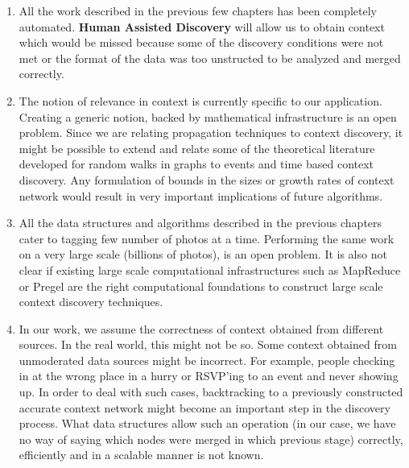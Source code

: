 \begin{enumerate}
\item All the work described in the previous few chapters has been completely automated. \textbf{Human Assisted Discovery} will allow us to obtain context which would be missed because some of the discovery conditions were not met or the format of the data was too unstructed to be analyzed and merged correctly. 

\item The notion of relevance in context is currently specific to our application. Creating a generic notion, backed by mathematical infrastructure is an open problem. Since we are relating propagation techniques to context discovery, it might be possible to extend and relate some of the theoretical literature developed for random walks in graphs to events and time based context discovery. Any formulation of bounds in the sizes or growth rates of context network would result in very important implications of future algorithms.

\item All the data structures and algorithms described in the previous chapters cater to tagging few number of photos at a time. Performing the same work on a very large scale (billions of photos), is an open problem. It is also not clear if existing large scale computational infrastructures such as MapReduce or Pregel are the right computational foundations to construct large scale context discovery techniques.

\item In our work, we assume the correctness of context obtained from different sources. In the real world, this might not be so. Some context obtained from unmoderated data sources might be incorrect. For example, people checking in at the wrong place in a hurry or RSVP'ing to an event and never showing up. In order to deal with such cases, backtracking to a previously constructed accurate context network might become an important step in the discovery process. What data structures allow such an operation (in our case, we have no way of saying which nodes were merged in which previous stage) correctly, efficiently and in a scalable manner is not known.


\end{enumerate}
